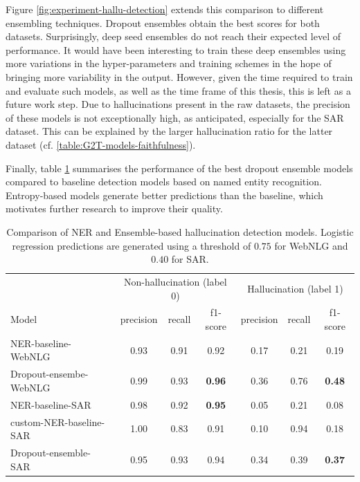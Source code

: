 Figure \ref{fig:experiment-hallu-detection} extends this comparison to different ensembling techniques. Dropout ensembles obtain the best scores for both datasets. Surprisingly, deep seed ensembles do not reach their expected level of performance\cite{evalUQDatasetShift}. It would have been interesting to train these deep ensembles using more variations in the hyper-parameters and training schemes in the hope of bringing more variability in the output. However, given the time required to train and evaluate such models, as well as the time frame of this thesis, this is left as a future work step. Due to hallucinations present in the raw datasets, the precision of these models is not exceptionally high, as anticipated, especially for the SAR dataset. This can be explained by the larger hallucination ratio for the latter dataset (cf. \ref{table:G2T-models-faithfulness}).

Finally, table \ref{table:baseline-ner-hallucination-detection} summarises the performance of the best dropout ensemble models compared to baseline detection models based on named entity recognition. Entropy-based models generate better predictions than the baseline, which motivates further research to improve their quality.

\begin{table}[ht]
\centering
\caption{Comparison of NER and Ensemble-based hallucination detection models. Logistic regression predictions are generated using a threshold of $0.75$ for WebNLG and $0.40$ for SAR.}
\label{table:baseline-ner-hallucination-detection}
\begin{tabular}[t]{lcccccc} %
\toprule
& \multicolumn{3}{c}{Non-hallucination (label 0)} & \multicolumn{3}{c}{Hallucination (label 1)} \\
 \cmidrule(rl){2-4} \cmidrule(rl){5-7}
Model & precision & recall & f1-score & precision & recall & f1-score \\
\midrule
NER-baseline-WebNLG     &     0.93      & 0.91      & 0.92 &     0.17      & 0.21 & 0.19 \\
Dropout-ensembe-WebNLG & 0.99      &0.93   &   \textbf{0.96}  &     0.36    &  0.76   &   \textbf{0.48}  \\
NER-baseline-SAR        &      0.98    &  0.92   &  \textbf{ 0.95}   &  0.05      &0.21 &     0.08 \\
custom-NER-baseline-SAR &     1.00  &    0.83   &   0.91  &  0.10  &    0.94  &    0.18\\

Dropout-ensemble-SAR  & 0.95  &    0.93  &    0.94 &         0.34  &    0.39  &    \textbf{0.37} \\


\bottomrule
\end{tabular}
\end{table}%



